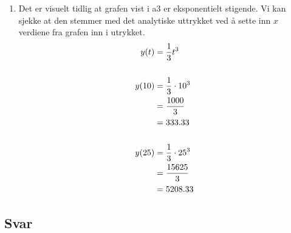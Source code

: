 \documentclass[answers,11pt]{exam}
\begin{document}
\begin{enumerate}[label=\alph*)]
\begin{tcolorbox}
\begin{enumerate}[label=c\arabic*)]
      \item
            Det er visuelt tidlig at grafen vist i a3 er eksponentielt
            stigende. Vi kan
            sjekke at den stemmer med det analytiske uttrykket ved å sette inn
            $x$ verdiene
            fra grafen inn i utrykket.
            \begin{align}
              y(t)  & = \frac{1}{3}t^3 \notag         \\ \\
              y(10) & = \frac{1}{3} \cdot 10^3 \notag \\
                    & = \frac{1000}{3} \notag         \\
                    & = 333.33 \notag                 \\ \\
              y(25) & = \frac{1}{3} \cdot 25^3 \notag \\
                    & = \frac{15625}{3} \notag        \\
                    & = 5208.33
            \end{align}

    \end{enumerate}
  \end{tcolorbox}

  \newpage
  

  \begin{tcolorbox}
    \subsection*{Svar}


\end{tcolorbox}
\end{enumerate}
\end{document}
